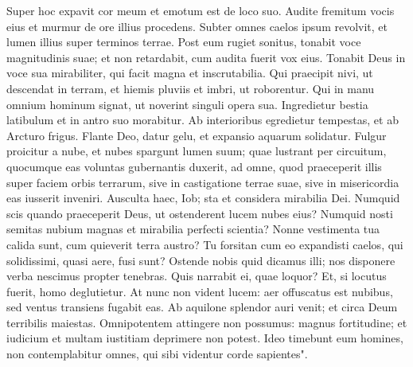 \begin{biblechapter}  
\verse Super hoc expavit cor meum et emotum est de loco suo. 
\verse Audite fremitum vocis eius et murmur de ore illius procedens. 
\verse Subter omnes caelos ipsum revolvit, et lumen illius super terminos terrae. 
\verse Post eum rugiet sonitus, tonabit voce magnitudinis suae; et non retardabit, cum audita fuerit vox eius. 
\verse Tonabit Deus in voce sua mirabiliter, qui facit magna et inscrutabilia. 
\verse Qui praecipit nivi, ut descendat in terram, et hiemis pluviis et imbri, ut roborentur. 
\verse Qui in manu omnium hominum signat, ut noverint singuli opera sua. 
\verse Ingredietur bestia latibulum et in antro suo morabitur. 
\verse Ab interioribus egredietur tempestas, et ab Arcturo frigus. 
\verse Flante Deo, datur gelu, et expansio aquarum solidatur. 
\verse Fulgur proicitur a nube, et nubes spargunt lumen suum; 
\verse quae lustrant per circuitum, quocumque eas voluntas gubernantis duxerit, ad omne, quod praeceperit illis super faciem orbis terrarum, 
\verse sive in castigatione terrae suae, sive in misericordia eas iusserit inveniri. 
\verse Ausculta haec, Iob; sta et considera mirabilia Dei. 
\verse Numquid scis quando praeceperit Deus, ut ostenderent lucem nubes eius? 
\verse Numquid nosti semitas nubium magnas et mirabilia perfecti scientia? 
\verse Nonne vestimenta tua calida sunt, cum quieverit terra austro? 
\verse Tu forsitan cum eo expandisti caelos, qui solidissimi, quasi aere, fusi sunt? 
\verse Ostende nobis quid dicamus illi; nos disponere verba nescimus propter tenebras. 
\verse Quis narrabit ei, quae loquor? Et, si locutus fuerit, homo deglutietur. 
\verse At nunc non vident lucem: aer offuscatus est nubibus, sed ventus transiens fugabit eas. 
\verse Ab aquilone splendor auri venit; et circa Deum terribilis maiestas. 
\verse Omnipotentem attingere non possumus: magnus fortitudine; et iudicium et multam iustitiam deprimere non potest. 
\verse Ideo timebunt eum homines, non contemplabitur omnes, qui sibi videntur corde sapientes". 
\end{biblechapter}

